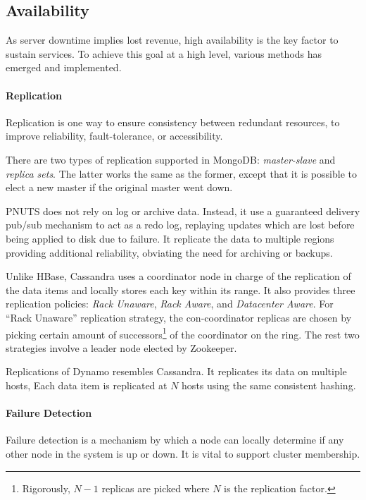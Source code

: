 \documentclass[letter,twocolumn]{article}
\begin{document}
\subsection{Availability}
As server downtime implies lost revenue, high availability is the key factor to sustain services. To achieve this goal at a high level, various methods has emerged and implemented.

\paragraph*{Replication}
Replication is one way to ensure consistency between redundant resources, to improve reliability, fault-tolerance, or accessibility. 

There are two types of replication supported in MongoDB: \textit{master-slave} and \textit{replica sets}.\citep{Suter2012} The latter works the same as the former, except that it is possible to elect a new master if the original master went down.

PNUTS does not rely on log or archive data. Instead, it use a guaranteed delivery pub/sub mechanism to act as a redo log, replaying updates which are lost before being applied to disk due to failure. It replicate the data to multiple regions providing additional reliability, obviating the need for archiving or backups.

Unlike HBase, Cassandra uses a coordinator node in charge of the replication of the data items and locally stores each key within its range. It also provides three replication policies: \textit{Rack Unaware}, \textit{Rack Aware}, and \textit{Datacenter Aware}. For ``Rack Unaware'' replication strategy, the con-coordinator replicas are chosen by picking certain amount of successors\footnote{Rigorously, $N-1$ replicas are picked where $N$ is the replication factor.} of the coordinator on the ring. The rest two strategies involve a leader node elected by Zookeeper.\citep{Hunt2010}

Replications of Dynamo\citep{DeCandia2007} resembles Cassandra. It replicates its data on multiple hosts, Each data item is replicated at $N$ hosts using the same consistent hashing. 

\paragraph*{Failure Detection}
Failure detection is a mechanism by which a node can locally determine if any other node in the system is up or down. It is vital to support cluster membership.
\end{document}
